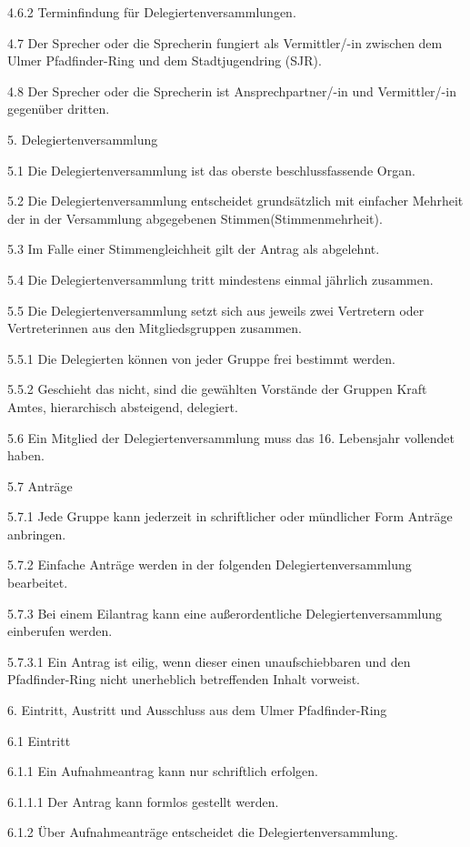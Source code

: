 4.6.2 Terminfindung für Delegiertenversammlungen.

4.7 Der Sprecher oder die Sprecherin fungiert als Vermittler/-in zwischen dem Ulmer Pfadfinder-Ring und dem Stadtjugendring (SJR).

4.8 Der Sprecher oder die Sprecherin ist Ansprechpartner/-in und Vermittler/-in gegenüber dritten.

5. Delegiertenversammlung

5.1 Die Delegiertenversammlung ist das oberste beschlussfassende Organ.

5.2 Die Delegiertenversammlung entscheidet grundsätzlich mit einfacher Mehrheit der in der Versammlung abgegebenen Stimmen(Stimmenmehrheit).

5.3 Im Falle einer Stimmengleichheit gilt der Antrag als abgelehnt.

5.4 Die Delegiertenversammlung tritt mindestens einmal jährlich zusammen.

5.5 Die Delegiertenversammlung setzt sich aus jeweils zwei Vertretern oder Vertreterinnen aus den Mitgliedsgruppen zusammen.

5.5.1 Die Delegierten können von jeder Gruppe frei bestimmt werden.

5.5.2 Geschieht das nicht, sind die gewählten Vorstände der Gruppen Kraft Amtes, hierarchisch absteigend, delegiert.

5.6 Ein Mitglied der Delegiertenversammlung muss das 16. Lebensjahr vollendet haben.

5.7 Anträge

5.7.1 Jede Gruppe kann jederzeit in schriftlicher oder mündlicher Form Anträge anbringen.

5.7.2 Einfache Anträge werden in der folgenden Delegiertenversammlung bearbeitet.

5.7.3 Bei einem Eilantrag kann eine außerordentliche Delegiertenversammlung einberufen werden.

5.7.3.1 Ein Antrag ist eilig, wenn dieser einen unaufschiebbaren und den Pfadfinder-Ring nicht unerheblich betreffenden Inhalt vorweist.

6. Eintritt, Austritt und Ausschluss aus dem Ulmer Pfadfinder-Ring

6.1 Eintritt

6.1.1 Ein Aufnahmeantrag kann nur schriftlich erfolgen.

6.1.1.1 Der Antrag kann formlos gestellt werden.

6.1.2 Über Aufnahmeanträge entscheidet die Delegiertenversammlung.

